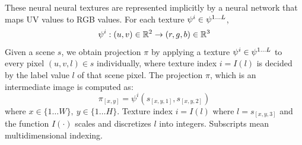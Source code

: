 \documentclass{article}
\begin{document}
		These neural neural textures are represented implicitly by a neural network that maps UV values to RGB values. %
		For each texture $\psi^i \in \psi^{1\dots L}$, 
		\begin{equation}
			\psi^i: (u,v) \in\real^2 \rightarrow (r,g,b) \in\real^3 %
		\end{equation}
		Given a scene $s$, we obtain projection $\pi$ by applying a texture $\psi^i \in \psi^{1\dots L}$ to every pixel $(u,v,l) \in s$ individually, where texture index $i=I(l)$ is decided by the label value $l$ of that scene pixel. The projection $\pi$, which is an intermediate image is computed as:
		\begin{equation}
			\pi_{[x,y]}=\psi^i(s_{[x,y,1]},s_{[x,y,2]})
		\end{equation}
		where $ x\in \{1\dots W\},\ y\in \{1\dots H\}$. Texture index $i = I(l)$ where $l=s_{[x,y,3]}$ and the function $I(\cdot)$ scales and discretizes $l$ into integers. Subscripts mean multidimensional indexing.
		
\end{document}
